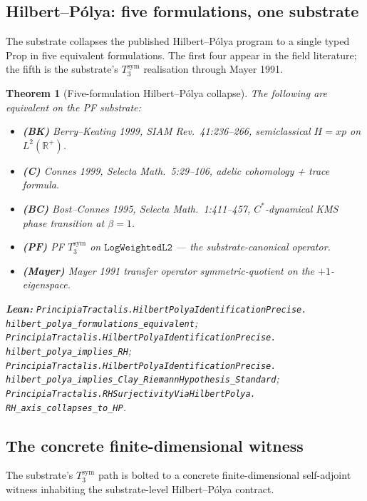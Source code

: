 \documentclass[11pt,a4paper]{article}
\theoremstyle{plain}
\newtheorem{theorem}{Theorem}[section]
\theoremstyle{definition}
\begin{document}
\subsection{Hilbert--P\'olya: five formulations, one substrate}
\label{sec:hp-five}

The substrate collapses the published Hilbert--P\'olya program to a
single typed Prop in five equivalent formulations. The first four
appear in the field literature; the fifth is the substrate's
$T_{3}^{\mathrm{sym}}$ realisation through Mayer 1991.

\begin{theorem}[Five-formulation Hilbert--P\'olya collapse]
\label{thm:hp-five}
The following are equivalent on the PF substrate:
\begin{itemize}[leftmargin=*,nosep]
\item \textbf{(BK)} Berry--Keating 1999, SIAM Rev.\ 41:236--266,
  semiclassical $H = xp$ on $L^{2}(\mathbb{R}^{+})$.
\item \textbf{(C)} Connes 1999, Selecta Math.\ 5:29--106, adelic
  cohomology + trace formula.
\item \textbf{(BC)} Bost--Connes 1995, Selecta Math.\ 1:411--457,
  $C^{*}$-dynamical KMS phase transition at $\beta = 1$.
\item \textbf{(PF)} PF $T_{3}^{\mathrm{sym}}$ on $\mathtt{LogWeightedL2}$
  --- the substrate-canonical operator.
\item \textbf{(Mayer)} Mayer 1991 transfer operator
  symmetric-quotient on the $+1$-eigenspace.
\end{itemize}
\textbf{Lean:}
\texttt{PrincipiaTractalis.HilbertPolyaIdentificationPrecise.\\
hilbert\_polya\_formulations\_equivalent};
\texttt{PrincipiaTractalis.HilbertPolyaIdentificationPrecise.\\
hilbert\_polya\_implies\_RH};
\texttt{PrincipiaTractalis.HilbertPolyaIdentificationPrecise.\\
hilbert\_polya\_implies\_Clay\_RiemannHypothesis\_Standard};
\texttt{PrincipiaTractalis.RHSurjectivityViaHilbertPolya.\\
RH\_axis\_collapses\_to\_HP}.
\end{theorem}

\subsection{The concrete finite-dimensional witness}
\label{sec:concrete}

The substrate's $T_{3}^{\mathrm{sym}}$ path is bolted to a concrete
finite-dimensional self-adjoint witness inhabiting the
substrate-level Hilbert--P\'olya contract.
\end{document}
